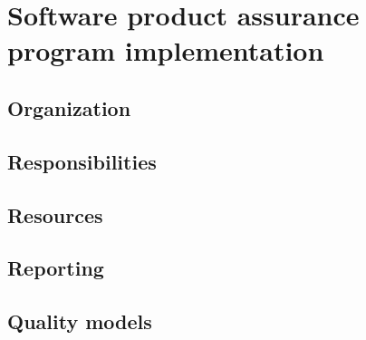 
\chapter{Software product assurance program implementation}

\section{Organization}


\section{Responsibilities}


\section{Resources}

\section{Reporting}

\section{Quality models}

